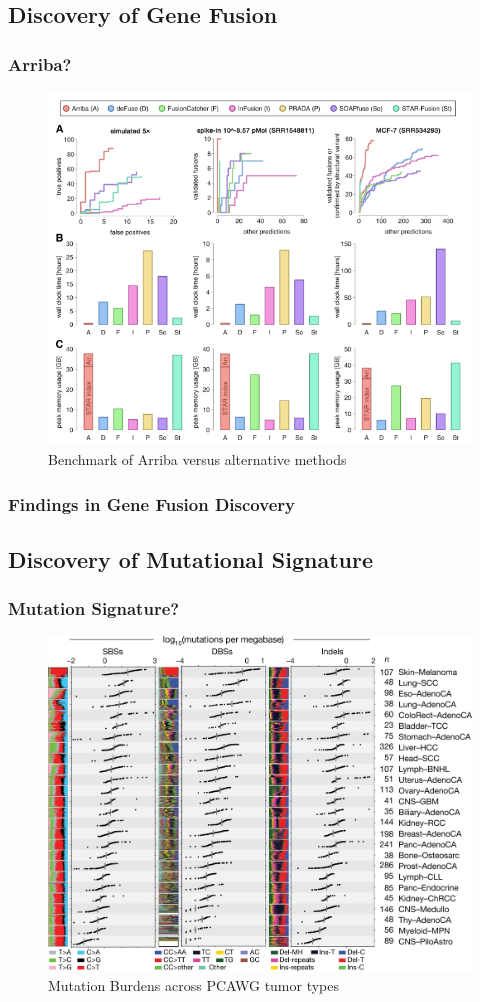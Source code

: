\documentclass{beamer}
\begin{document}
    \subsection{Discovery of Gene Fusion}
    \begin{frame}
        \frametitle{Arriba?}

        \begin{figure}
            \includegraphics[width=0.6 \linewidth]{figures/Workflow/Arriba.png}
            \caption{Benchmark of Arriba versus alternative methods \protect\cite{Arriba1}}
        \end{figure}
    \end{frame}

    \begin{frame}
        \frametitle{Findings in Gene Fusion Discovery}
    \end{frame}

    \subsection{Discovery of Mutational Signature}
    \begin{frame}
        \frametitle{Mutation Signature?}

        \begin{figure}
            \includegraphics[width=0.6 \linewidth]{figures/LungCancer/signatures.jpg}
            \caption{Mutation Burdens across PCAWG tumor types \protect\cite{signature1}}
        \end{figure}
    \end{frame}
\end{document}
